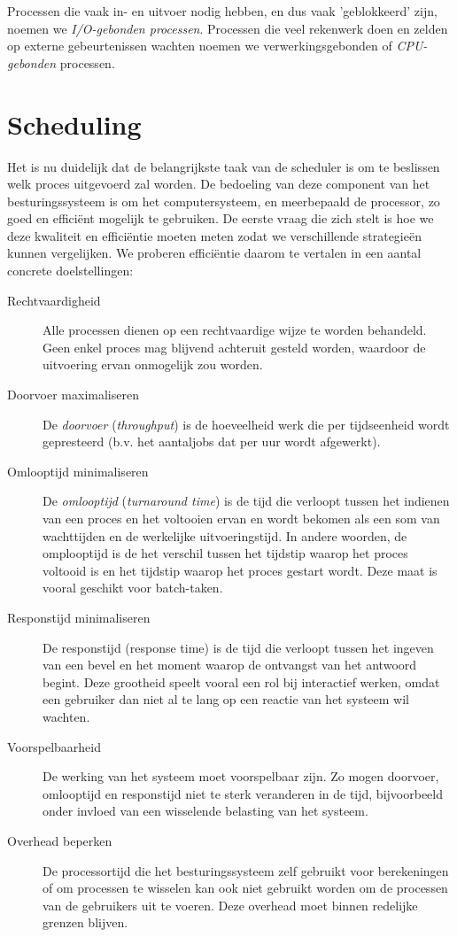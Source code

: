 Processen die vaak in- en uitvoer nodig hebben, en dus vaak
'geblokkeerd' zijn, noemen we \emph{I/O-gebonden
processen}. Processen die veel rekenwerk doen en zelden op
externe gebeurtenissen wachten noemen we verwerkingsgebonden of
\emph{CPU-gebonden} processen.

\section{Scheduling}

Het is nu duidelijk dat de belangrijkste taak van de scheduler is
om te beslissen welk proces uitgevoerd zal worden. De bedoeling van deze
component van het besturingssysteem is om het computersysteem, en
meerbepaald de processor, zo goed en effici\"ent mogelijk te gebruiken. De
eerste vraag die zich stelt is hoe we deze kwaliteit en effici\"entie
moeten meten zodat we verschillende strategie\"en kunnen vergelijken. We
proberen effici\"entie daarom te vertalen in een aantal concrete
doelstellingen:

\begin{description}
\item[Rechtvaardigheid] Alle processen dienen op een rechtvaardige wijze te
worden behandeld. Geen enkel proces mag blijvend achteruit gesteld worden,
waardoor de uitvoering ervan onmogelijk zou worden.
\item[Doorvoer maximaliseren] De \emph{doorvoer}
(\emph{throughput}) is de hoeveelheid werk die per tijdseenheid
wordt gepresteerd (b.v. het aantaljobs dat per uur wordt afgewerkt).
\item[Omlooptijd minimaliseren] De \emph{omlooptijd}
(\emph{turnaround time}) is de tijd die verloopt tussen het
indienen van een proces en het voltooien ervan en wordt bekomen als een som van
wachttijden en de werkelijke uitvoeringstijd. In andere woorden, de omplooptijd
is de het verschil tussen het tijdstip waarop het proces voltooid is en het
tijdstip waarop het proces gestart wordt. Deze maat is vooral geschikt voor
batch-taken.
\item[Responstijd minimaliseren] De responstijd (response time) is de tijd die
verloopt tussen het ingeven van een bevel en het moment waarop de ontvangst van
het antwoord begint. Deze grootheid speelt vooral een rol bij interactief
werken, omdat een gebruiker dan niet al te lang op een reactie van het systeem
wil wachten.
\item[Voorspelbaarheid] De werking van het systeem moet voorspelbaar zijn. Zo
mogen doorvoer, omlooptijd en responstijd niet te sterk veranderen in de tijd,
bijvoorbeeld onder invloed van een wisselende belasting van het systeem.
\item[Overhead beperken] De processortijd die het besturingssysteem zelf
gebruikt voor berekeningen of om processen te wisselen kan ook niet gebruikt
worden om de processen van de gebruikers uit te voeren. Deze overhead moet
binnen redelijke grenzen blijven.
\end{description}

